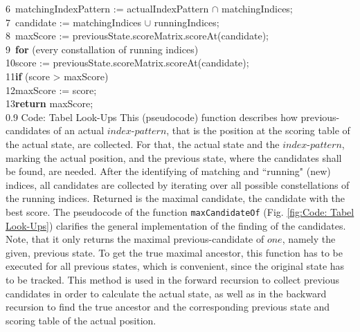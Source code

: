 \documentclass[a4paper,10pt]{thesis}
\newcommand{\iP}{$index\texttt{-}pattern$}
\begin{document}
{{{{{          6\ \hspace*{2em}\hspace*{2em}matchingIndexPattern := actualIndexPattern $\cap$ matchingIndices;\vspace{1em}\\
          7\ \hspace*{2em}\hspace*{2em}candidate := matchingIndices $\cup$ runningIndices;\\
          8\ \hspace*{2em}\hspace*{2em}maxScore := previousState.scoreMatrix.scoreAt(candidate);\\
          9\ \hspace*{2em}\hspace*{2em}\textbf{for} (every constallation of running indices) \\
          10\hspace*{2em}\hspace*{2em}\hspace*{2em}score := previousState.scoreMatrix.scoreAt(candidate);\\
          11\hspace*{2em}\hspace*{2em}\hspace*{2em}\textbf{if} (score > maxScore)\\
          12\hspace*{2em}\hspace*{2em}\hspace*{2em}\hspace*{2em}maxScore := score;\vspace{1em}\\
          13\hspace*{2em}\hspace*{2em}\textbf{return} maxScore;\\
        }
        {0.9\columnwidth}
        {Code: Tabel Look-Ups}
        {This (pseudocode) function describes how previous-candidates of an actual \iP{}, that is the position at the scoring table of the actual state, are collected. For that, the actual state and the \iP{}, marking the actual position, and the previous state, where the candidates shall be found, are needed. After the identifying of matching and ``running" (new) indices, all candidates are collected by iterating over all possible constellations of the running indices. Returned is the maximal candidate, the candidate with the best score.}%
        The pseudocode of the function \texttt{maxCandidateOf} (Fig. \ref{fig:Code: Tabel Look-Ups}) clarifies the general implementation of the finding of the candidates. Note, that it only returns the maximal previous-candidate of $one$, namely the given, previous state. To get the true maximal ancestor, this function has to be executed for all previous states, which is convenient, since the original state has to be tracked. This method is used in the forward recursion to collect previous candidates in order to calculate the actual state, as well as in the backward recursion to find the true ancestor and the corresponding previous state and scoring table of the actual position.
}}}}
\end{document}
